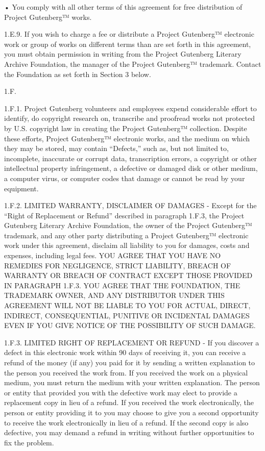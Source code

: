     • You comply with all other terms of this agreement for free
        distribution of Project Gutenberg™ works.
    

1.E.9. If you wish to charge a fee or distribute a Project
Gutenberg™ electronic work or group of works on different terms than
are set forth in this agreement, you must obtain permission in writing
from the Project Gutenberg Literary Archive Foundation, the manager of
the Project Gutenberg™ trademark. Contact the Foundation as set
forth in Section 3 below.

1.F.

1.F.1. Project Gutenberg volunteers and employees expend considerable
effort to identify, do copyright research on, transcribe and proofread
works not protected by U.S. copyright law in creating the Project
Gutenberg™ collection. Despite these efforts, Project Gutenberg™
electronic works, and the medium on which they may be stored, may
contain “Defects,” such as, but not limited to, incomplete, inaccurate
or corrupt data, transcription errors, a copyright or other
intellectual property infringement, a defective or damaged disk or
other medium, a computer virus, or computer codes that damage or
cannot be read by your equipment.

1.F.2. LIMITED WARRANTY, DISCLAIMER OF DAMAGES - Except for the “Right
of Replacement or Refund” described in paragraph 1.F.3, the Project
Gutenberg Literary Archive Foundation, the owner of the Project
Gutenberg™ trademark, and any other party distributing a Project
Gutenberg™ electronic work under this agreement, disclaim all
liability to you for damages, costs and expenses, including legal
fees. YOU AGREE THAT YOU HAVE NO REMEDIES FOR NEGLIGENCE, STRICT
LIABILITY, BREACH OF WARRANTY OR BREACH OF CONTRACT EXCEPT THOSE
PROVIDED IN PARAGRAPH 1.F.3. YOU AGREE THAT THE FOUNDATION, THE
TRADEMARK OWNER, AND ANY DISTRIBUTOR UNDER THIS AGREEMENT WILL NOT BE
LIABLE TO YOU FOR ACTUAL, DIRECT, INDIRECT, CONSEQUENTIAL, PUNITIVE OR
INCIDENTAL DAMAGES EVEN IF YOU GIVE NOTICE OF THE POSSIBILITY OF SUCH
DAMAGE.

1.F.3. LIMITED RIGHT OF REPLACEMENT OR REFUND - If you discover a
defect in this electronic work within 90 days of receiving it, you can
receive a refund of the money (if any) you paid for it by sending a
written explanation to the person you received the work from. If you
received the work on a physical medium, you must return the medium
with your written explanation. The person or entity that provided you
with the defective work may elect to provide a replacement copy in
lieu of a refund. If you received the work electronically, the person
or entity providing it to you may choose to give you a second
opportunity to receive the work electronically in lieu of a refund. If
the second copy is also defective, you may demand a refund in writing
without further opportunities to fix the problem.

